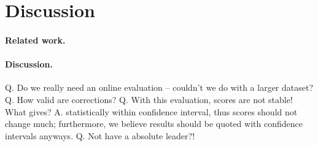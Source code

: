 \section{Discussion}
\label{sec:discussion}

\paragraph{Related work.}

\paragraph{Discussion.}

Q. Do we really need an online evaluation -- couldn't we do with a larger dataset?
Q. How valid are corrections?
Q. With this evaluation, scores are not stable! What gives?
A. statistically within confidence interval, thus scores should not change much; furthermore, we believe results should be quoted with confidence intervals anyways. 
Q. Not have a absolute leader?!

